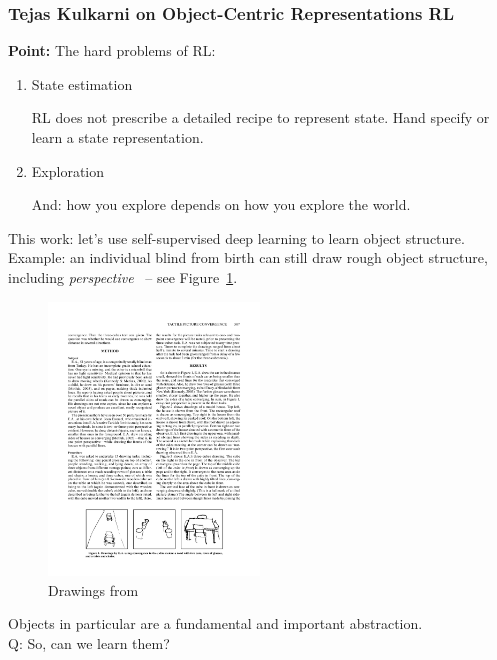 \subsubsection{Tejas Kulkarni on Object-Centric Representations RL}

{\bf Point:} The hard problems of RL:
\begin{enumerate}
    \item State estimation
    
    RL does not prescribe a detailed recipe to represent state. Hand specify or learn a state representation.
    
    \item Exploration
    
    And: how you explore depends on how you explore the world.
\end{enumerate}

This work: let's use self-supervised deep learning to learn object structure. \\

Example: an individual blind from birth can still draw rough object structure, including {\it perspective}~\cite{kennedy2006blind} -- see Figure~\ref{fig:drawing}. \\

\begin{figure}[h!]
    \centering
    \includegraphics[width=0.5\textwidth]{images/drawing.pdf}
    \caption{Drawings from~\citet{kleinberg2016inherent}}
    \label{fig:drawing}
\end{figure}

Objects in particular are a fundamental and important abstraction.\\

Q: So, can we learn them?\\

